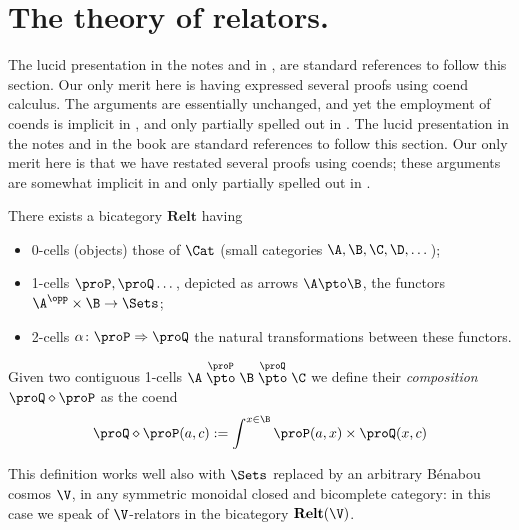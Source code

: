 \section{The theory of relators.}\label{sec:relators}
The lucid presentation in the notes \cite{benabou2000distributors} and in \cite[\S \textbf{4}]{Cordier2008}, \cite{Bor2} are standard references to follow this section. Our only merit here is having expressed several proofs using coend calculus. The arguments are essentially unchanged, and yet the employment of coends is implicit in \cite{benabou2000distributors}, and only partially spelled out in \cite{Bor2}.%
The lucid presentation in the notes \cite{benabou2000distributors} and in the book \cite[\S \textbf{4}]{Cordier2008} are standard references to follow this section. Our only merit here is that we have restated several proofs using coends; these arguments are somewhat implicit in \cite{benabou2000distributors} and only partially spelled out in \cite{Bor2}.
\def\Dist{\textbf{Relt}}
\begin{definition}\label{profdef}
There exists a bicategory $\Dist$ having
\begin{itemize}
\item 0-cells (objects) those of $\Cat$ (small categories $\A,\B,\C,\D,\dots$);
\item 1-cells $\proP,\proQ\dots$, depicted as arrows $\A\pto \B$, the functors $\A^\opp\times\B\to \Sets$;
\item 2-cells $\alpha\colon\proP\Rightarrow\proQ$ the natural transformations between these functors.
\end{itemize}
Given two contiguous 1-cells $\A\stackrel{\proP}{\pto}\B\stackrel{\proQ}{\pto}\C$ we define their \emph{composition} $\proQ \diamond \proP$ as the coend
\[
\proQ \diamond \proP(a,c) := \int^{x\in\B} \proP(a,x)\times\proQ(x,c)
\]
\end{definition}
\begin{definition}
This definition works well also with $\Sets$ replaced by an arbitrary Bénabou cosmos $\V$, \ie in any symmetric monoidal closed and bicomplete category: in this case we speak of $\V$-relators in the bicategory $\Dist(\V)$.
\end{definition}
